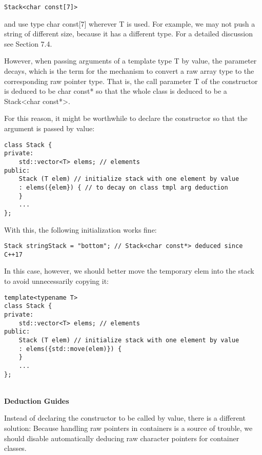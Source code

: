 \begin{lstlisting}[style=styleCXX]
Stack<char const[7]>
\end{lstlisting}

and use type char const[7] wherever T is used. For example, we may not push a string of different size, because it has a different type. For a detailed discussion see Section 7.4.

However, when passing arguments of a template type T by value, the parameter decays, which is the term for the mechanism to convert a raw array type to the corresponding raw pointer type. That is, the call parameter T of the constructor is deduced to be char const* so that the whole class is deduced to be a Stack<char const*>.

For this reason, it might be worthwhile to declare the constructor so that the argument is passed by value:

\begin{lstlisting}[style=styleCXX]
class Stack {
private:
	std::vector<T> elems; // elements
public:
	Stack (T elem) // initialize stack with one element by value
	: elems({elem}) { // to decay on class tmpl arg deduction
	}
	...
};
\end{lstlisting}

With this, the following initialization works fine:

\begin{lstlisting}[style=styleCXX]
Stack stringStack = "bottom"; // Stack<char const*> deduced since C++17
\end{lstlisting}

In this case, however, we should better move the temporary elem into the stack to avoid unnecessarily copying it:

\begin{lstlisting}[style=styleCXX]
template<typename T>
class Stack {
private:
	std::vector<T> elems; // elements
public:
	Stack (T elem) // initialize stack with one element by value
	: elems({std::move(elem)}) {
	}
	...
};
\end{lstlisting}

\hspace*{\fill} \\ %
\noindent
\textbf{Deduction Guides}

Instead of declaring the constructor to be called by value, there is a different solution: Because handling raw pointers in containers is a source of trouble, we should disable automatically deducing raw character pointers for container classes.

